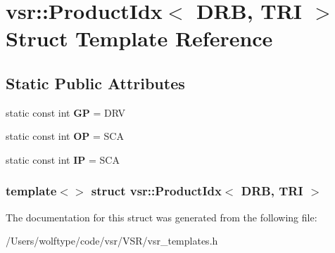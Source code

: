 \hypertarget{structvsr_1_1_product_idx_3_01_d_r_b_00_01_t_r_i_01_4}{\section{vsr\-:\-:Product\-Idx$<$ D\-R\-B, T\-R\-I $>$ Struct Template Reference}
\label{structvsr_1_1_product_idx_3_01_d_r_b_00_01_t_r_i_01_4}
}
\subsection*{Static Public Attributes}
\begin{DoxyCompactItemize}
\item 
\hypertarget{structvsr_1_1_product_idx_3_01_d_r_b_00_01_t_r_i_01_4_a836ca7acce5d768a82dea2ed76efada8}{static const int {\bfseries G\-P} = D\-R\-V}\label{structvsr_1_1_product_idx_3_01_d_r_b_00_01_t_r_i_01_4_a836ca7acce5d768a82dea2ed76efada8}

\item 
\hypertarget{structvsr_1_1_product_idx_3_01_d_r_b_00_01_t_r_i_01_4_a4befca89226b283a431242fbfaf1c13a}{static const int {\bfseries O\-P} = S\-C\-A}\label{structvsr_1_1_product_idx_3_01_d_r_b_00_01_t_r_i_01_4_a4befca89226b283a431242fbfaf1c13a}

\item 
\hypertarget{structvsr_1_1_product_idx_3_01_d_r_b_00_01_t_r_i_01_4_aba273acf0cc9abbea0a4994e23fe2b80}{static const int {\bfseries I\-P} = S\-C\-A}\label{structvsr_1_1_product_idx_3_01_d_r_b_00_01_t_r_i_01_4_aba273acf0cc9abbea0a4994e23fe2b80}

\end{DoxyCompactItemize}
\subsubsection*{template$<$$>$ struct vsr\-::\-Product\-Idx$<$ D\-R\-B, T\-R\-I $>$}



The documentation for this struct was generated from the following file\-:\begin{DoxyCompactItemize}
\item 
/\-Users/wolftype/code/vsr/\-V\-S\-R/vsr\-\_\-templates.\-h\end{DoxyCompactItemize}
